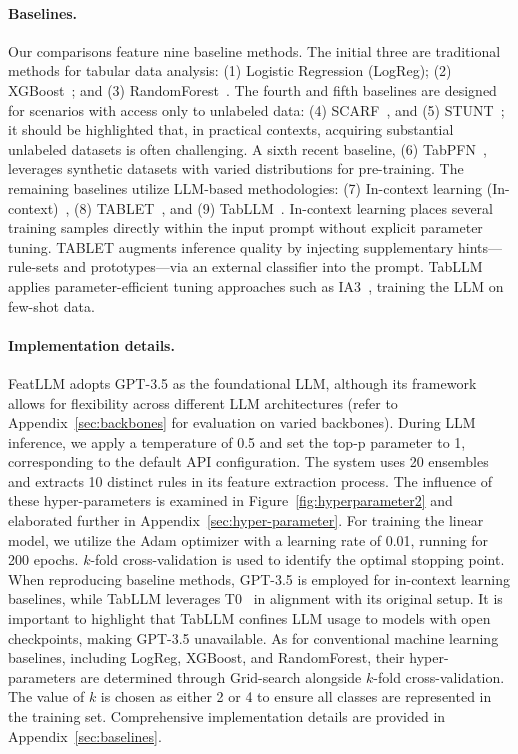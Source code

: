 \vspace*{-0.12in}
\paragraph{Baselines.}
Our comparisons feature nine baseline methods. The initial three are traditional methods for tabular data analysis: (1) Logistic Regression (LogReg); (2) XGBoost~\cite{chen2016xgboost}; and (3) RandomForest~\cite{ho1995random}. The fourth and fifth baselines are designed for scenarios with access only to unlabeled data: (4) SCARF~\cite{bahri2022scarf}, and (5) STUNT~\cite{nam2023stunt}; it should be highlighted that, in practical contexts, acquiring substantial unlabeled datasets is often challenging. A sixth recent baseline, (6) TabPFN~\cite{hollmann2022tabpfn}, leverages synthetic datasets with varied distributions for pre-training. The remaining baselines utilize LLM-based methodologies: (7) In-context learning (In-context)~\cite{wei2022emergent}, (8) TABLET~\cite{slack2023tablet}, and (9) TabLLM~\cite{hegselmann2023tabllm}. In-context learning places several training samples directly within the input prompt without explicit parameter tuning. TABLET augments inference quality by injecting supplementary hints—rule-sets and prototypes—via an external classifier into the prompt. TabLLM applies parameter-efficient tuning approaches such as IA3~\cite{liu2022few}, training the LLM on few-shot data.

\vspace*{-0.12in}
\paragraph{Implementation details.}
\textsf{FeatLLM} adopts GPT-3.5 as the foundational LLM, although its framework allows for flexibility across different LLM architectures (refer to Appendix~\ref{sec:backbones} for evaluation on varied backbones). During LLM inference, we apply a temperature of 0.5 and set the top-p parameter to 1, corresponding to the default API configuration. The system uses 20 ensembles and extracts 10 distinct rules in its feature extraction process. The influence of these hyper-parameters is examined in Figure~\ref{fig:hyperparameter2} and elaborated further in Appendix~\ref{sec:hyper-parameter}. For training the linear model, we utilize the Adam optimizer with a learning rate of 0.01, running for 200 epochs. $k$-fold cross-validation is used to identify the optimal stopping point. When reproducing baseline methods, GPT-3.5 is employed for in-context learning baselines, while TabLLM leverages T0~\cite{sanh2022multitask} in alignment with its original setup. It is important to highlight that TabLLM confines LLM usage to models with open checkpoints, making GPT-3.5 unavailable. As for conventional machine learning baselines, including LogReg, XGBoost, and RandomForest, their hyper-parameters are determined through Grid-search alongside $k$-fold cross-validation. The value of $k$ is chosen as either 2 or 4 to ensure all classes are represented in the training set. Comprehensive implementation details are provided in Appendix~\ref{sec:baselines}.

